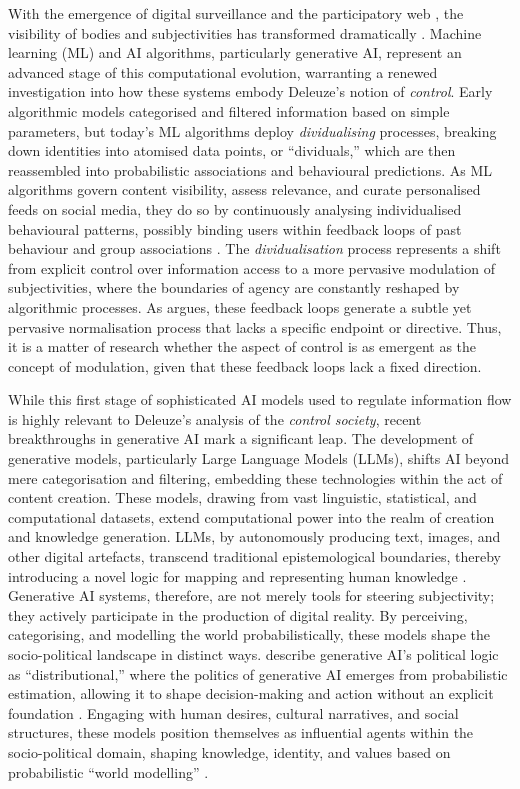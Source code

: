 With the emergence of digital surveillance and the participatory web , the visibility of bodies and subjectivities has transformed dramatically \parencite[]{Krasmann2017}. Machine learning (ML) and AI algorithms, particularly generative AI, represent an advanced stage of this computational evolution, warranting a renewed investigation into how these systems embody Deleuze’s notion of \textit{control}. Early algorithmic models categorised and filtered information based on simple parameters, but today’s ML algorithms deploy \textit{dividualising} processes, breaking down identities into atomised data points, or “dividuals,” which are then reassembled into probabilistic associations and behavioural predictions. As ML algorithms govern content visibility, assess relevance, and curate personalised feeds on social media, they do so by continuously analysing individualised behavioural patterns, possibly binding users within feedback loops of past behaviour and group associations \parencite[]{Otterlo2013, Cheney2011}. The \textit{dividualisation} process represents a shift from explicit control over information access to a more pervasive modulation of subjectivities, where the boundaries of agency are constantly reshaped by algorithmic processes.  As \cite{Rouvroy2013} argues, these feedback loops generate a subtle yet pervasive normalisation process that lacks a specific endpoint or directive. Thus, it is a matter of research whether the aspect of control is as emergent as the concept of modulation, given that these feedback loops lack a fixed direction.

While this first stage of sophisticated AI models used to regulate information flow is highly relevant to Deleuze’s analysis of the \textit{control society}, recent breakthroughs in generative AI mark a significant leap. The development of generative models, particularly Large Language Models (LLMs), shifts AI beyond mere categorisation and filtering, embedding these technologies within the act of content creation. These models, drawing from vast linguistic, statistical, and computational datasets, extend computational power into the realm of creation and knowledge generation. LLMs, by autonomously producing text, images, and other digital artefacts, transcend traditional epistemological boundaries, thereby introducing a novel logic for mapping and representing human knowledge \parencite[]{amoore2024}. Generative AI systems, therefore, are not merely tools for steering subjectivity; they actively participate in the production of digital reality.  By perceiving, categorising, and modelling the world probabilistically, these models shape the socio-political landscape in distinct ways. \cite{amoore2024} describe generative AI’s political logic as “distributional,” where the politics of generative AI emerges from probabilistic estimation, allowing it to shape decision-making and action without an explicit foundation \parencite[]{amoore2024}. Engaging with human desires, cultural narratives, and social structures, these models position themselves as influential agents within the socio-political domain, shaping knowledge, identity, and values based on probabilistic “world modelling” \parencite[]{amoore2024}.

